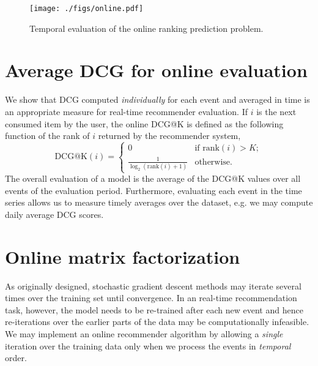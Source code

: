 \documentclass[10pt]{article}
\begin{document}
\begin{figure}
\centering
\texttt{[image: ./figs/online.pdf]}
\caption{Temporal evaluation of the online ranking prediction problem.}
\label{fig:online}
\end{figure}

\section{Average DCG for online evaluation}

We show that DCG computed \emph{individually} for each event and averaged in time is an appropriate measure for real-time recommender evaluation.
If $i$ is the next consumed item by the user, the online DCG@K is defined as the following function of the rank of $i$ returned by the recommender system,
\begin{equation}
  \mbox{DCG@K}(i) = 
     \begin{cases}
        0 & \mbox{if rank}(i) > K; \\
        \frac{\displaystyle 1}{\displaystyle \log_2 (\mbox{rank}(i)+1)} & \mbox{otherwise}.
     \end{cases}
  \label{eq:online-dcg}
\end{equation}
The overall evaluation of a model is the average of the DCG@K values over all events of the evaluation period.
Furthermore, evaluating each event in the time series allows us to measure timely averages over the dataset, e.g. we may compute daily average DCG scores.

\section{Online matrix factorization}
\label{sec:online-mf}

As originally designed, stochastic gradient descent methods may iterate several times over the training set until convergence.
In an real-time recommendation task, however, the model needs to be re-trained after each new event and hence re-iterations over the earlier parts of the data may be computationally infeasible.
We may implement an online recommender algorithm by allowing a \emph{single} iteration over the training data only when we process the events in \emph{temporal} order.
\end{document}
